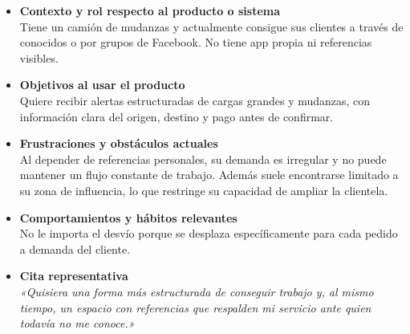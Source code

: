 \begin{itemize}[leftmargin=2em]
  \item\textbf{Contexto y rol respecto al producto o sistema} \hfill \\
    Tiene un camión de mudanzas y actualmente consigue sus clientes a través de conocidos o por grupos de Facebook. No tiene app propia ni referencias visibles.
  \item\textbf{Objetivos al usar el producto} \hfill \\
    Quiere recibir alertas estructuradas de cargas grandes y mudanzas, con información clara del origen, destino y pago antes de confirmar.
  \item\textbf{Frustraciones y obstáculos actuales} \hfill \\
    Al depender de referencias personales, su demanda es irregular y no puede mantener un flujo constante de trabajo. Además suele encontrarse limitado a su zona de influencia, lo que restringe su capacidad de ampliar la clientela.
  \item\textbf{Comportamientos y hábitos relevantes} \hfill \\
	No le importa el desvío porque se desplaza específicamente para cada pedido a demanda del cliente.
  \item\textbf{Cita representativa} \hfill \\
    \textit{«Quisiera una forma más estructurada de conseguir trabajo y, al mismo tiempo, un espacio con referencias que respalden mi servicio ante quien todavía no me conoce.»}
\end{itemize}
